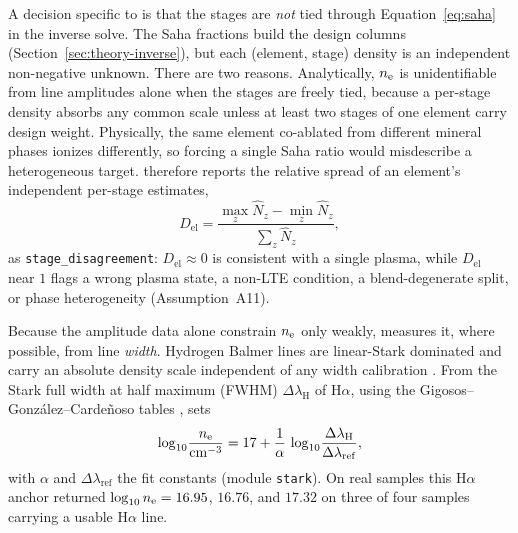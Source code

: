 A decision specific to \alibz{} is that the stages are \emph{not} tied through
Equation~\eqref{eq:saha} in the inverse solve. The Saha fractions build the design
columns (Section~\ref{sec:theory-inverse}), but each (element, stage) density is an
independent non-negative unknown. There are two reasons. Analytically, $n_{\mathrm{e}}$ is
unidentifiable from line amplitudes alone when the stages are freely tied, because a
per-stage density absorbs any common scale unless at least two stages of one element
carry design weight. Physically, the same element co-ablated from different mineral
phases ionizes differently, so forcing a single Saha ratio would misdescribe a
heterogeneous target. \alibz{} therefore reports the relative spread of an element's
independent per-stage estimates,
%
\begin{equation}
  \label{eq:stage-disagreement}
  D_\mathrm{el} = \frac{\max_z \hat N_z - \min_z \hat N_z}{\sum_z \hat N_z},
\end{equation}
%
as \texttt{stage\_disagreement}: $D_\mathrm{el}\!\approx\!0$ is consistent with a
single plasma, while $D_\mathrm{el}$ near $1$ flags a wrong plasma state, a non-LTE
condition, a blend-degenerate split, or phase heterogeneity (Assumption~A11).

Because the amplitude data alone constrain $n_{\mathrm{e}}$ only weakly, \alibz{} measures it,
where possible, from line \emph{width}. Hydrogen Balmer lines are linear-Stark
dominated and carry an absolute density scale independent of any width calibration
\citep{gigosos1996hbeta,konjevic2002review}.
From the Stark full width at half maximum (FWHM) $\Delta\lambda_{\mathrm H}$ of
H$\alpha$, using the Gigosos--Gonz\'alez--Carde\~noso tables \citep{gigosos2003halpha},
\alibz{} sets
%
\begin{equation}
  \label{eq:halpha}
  \log_{10}\!\frac{n_{\mathrm{e}}}{\si{\per\cubic\centi\meter}}
    = 17 + \frac{1}{\alpha}\,
      \log_{10}\!\frac{\Delta\lambda_{\mathrm H}}{\Delta\lambda_\mathrm{ref}},
\end{equation}
%
with $\alpha$ and $\Delta\lambda_\mathrm{ref}$ the fit constants (module
\texttt{stark}). On real samples this H$\alpha$ anchor returned
$\log_{10}n_{\mathrm{e}} = 16.95$, $16.76$, and $17.32$ on three of four samples carrying a
usable H$\alpha$ line.

